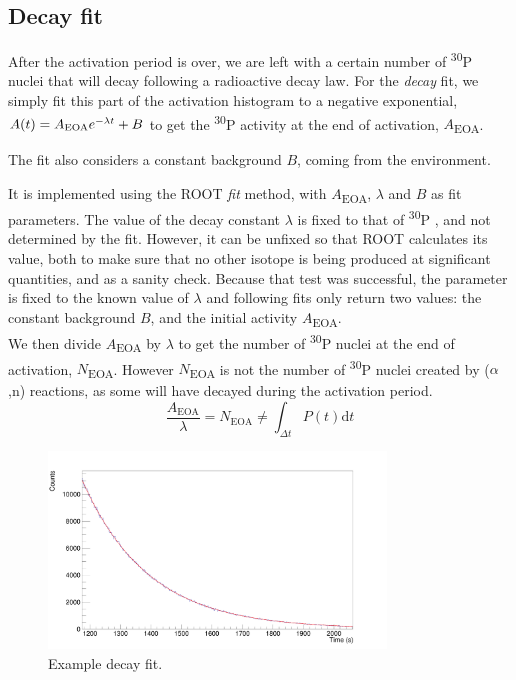 \documentclass[a4paper,12pt]{report}
\newcommand{\dif}{\text{d}}
\newcommand{\an}{($\alpha$,n) }
\newcommand{\Piso}{\textsuperscript{30}P }
\begin{document}
\subsection{Decay fit}
After the activation period is over, we are left with a certain number of \Piso nuclei that will decay following a radioactive decay law.
For the \textit{decay} fit, we simply fit this part of the activation histogram to a negative exponential, $A(t) = A\textsubscript{EOA} e^{-\lambda t} + B$ to get the \Piso activity at the end of activation, $A$\textsubscript{EOA}.

The fit also considers a constant background $B$, coming from the environment.

It is implemented using the ROOT \textit{fit} method, with $A$\textsubscript{EOA}, $\lambda$ and $B$ as fit parameters.
The value of the decay constant $\lambda$ is fixed to that of \Piso, and not determined by the fit.
However, it can be unfixed so that ROOT calculates its value, both to make sure that no other isotope is being produced at significant quantities, and as a sanity check.
Because that test was successful, the parameter is fixed to the known value of $\lambda$ and following fits only return two values: the constant background $B$, and the initial activity $A$\textsubscript{EOA}.
\\

We then divide $A$\textsubscript{EOA} by $\lambda$ to get the number of \Piso nuclei at the end of activation, $N$\textsubscript{EOA}.
However $N$\textsubscript{EOA} is not the number of \Piso nuclei created by \an reactions, as some will have decayed during the activation period.
\[ \frac{A_\text{EOA}}{\lambda} = N_\text{EOA} \neq \int_{\Delta t}P(t) \dif t \]

\begin{figure}[H]
	\centering
	\includegraphics[width=0.80\textwidth]{example_decay_fit.png}
	\caption{Example decay fit.}
	\label{example_decay_fit}
\end{figure}
\end{document}
